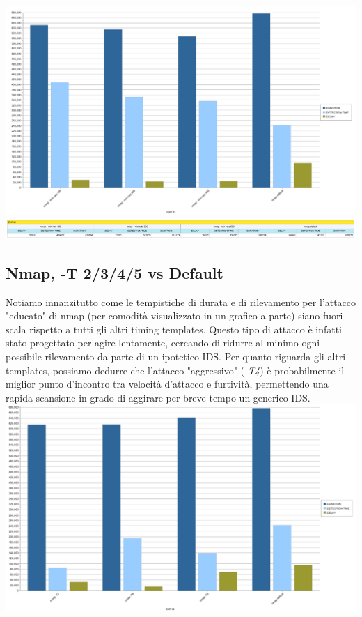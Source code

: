 \includegraphics[scale=0.3]{figure/tempi_nmap_minrate.jpg}\\

\includegraphics[scale=0.3]{figure/tabella_nmap_minrate.jpg}

\subsection{Nmap, -T 2/3/4/5 vs Default}
Notiamo innanzitutto come le tempistiche di durata e di rilevamento per l'attacco "educato" di nmap (per comodità visualizzato in un grafico a parte) siano fuori scala rispetto a tutti gli altri timing templates. Questo tipo di attacco è infatti stato progettato per agire lentamente, cercando di ridurre al minimo ogni possibile rilevamento da parte di un ipotetico IDS. Per quanto riguarda gli altri templates, possiamo dedurre che l'attacco "aggressivo" (\textit{-T4}) è probabilmente il miglior punto d'incontro tra velocità d'attacco e furtività, permettendo una rapida scansione in grado di aggirare per breve tempo un generico IDS.\\

\includegraphics[scale=0.3]{figure/tempi_nmap_T.jpg}\\

